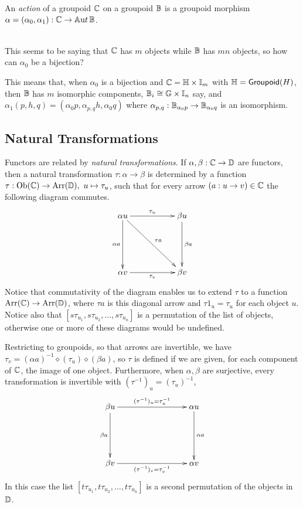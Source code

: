 \begin{defn}
An \emph{action} of a groupoid $\mathbb{C}$ on a groupoid $\mathbb{B}$ 
is a groupoid morphism $\alpha=(\alpha_0,\alpha_1):\mathbb{C}\to\mathbb{A}{\mathrm ut}\,\mathbb{B}$. 
\end{defn}

\\ 
\noindent This seems to be saying that $\mathbb{C}$ has $m$ objects while $\mathbb{B}$ has $mn$ objects, 
so how can $\alpha_0$ be a bijection? 

\medskip
This means that, when $\alpha_0$ is a bijection and 
$\mathbb{C} = \mathbb{H} \times \mathbb{I}_m$ with $\mathbb{H} = {\sf Groupoid}(H)$, 
then $\mathbb{B}$ has $m$ isomorphic components, 
$\mathbb{B}_i \cong \mathbb{G} \times \mathbb{I}_n$ say, 
and $\alpha_1(p,h,q) = (\alpha_0p, \alpha_{p,q}h, \alpha_0q)$ 
where $\alpha_{p,q} : \mathbb{B}_{\alpha_0p} \to \mathbb{B}_{\alpha_0q}$ 
is an isomorphism. 





\newpage
\subsection{Natural Transformations}

Functors are related by \emph{natural transformations}. 
  
If $\alpha,\beta : \mathbb{C} \to \mathbb{D}$ are functors, 
then a natural transformation  $\tau : \alpha \to \beta$ 
is determined by a function 
$\tau : \mathrm{Ob}(\mathbb{C}) \to \mathrm{Arr}(\mathbb{D}),~ u \mapsto \tau_u$, 
such that for every arrow $(a : u \to v) \in \mathbb{C}$ 
the following diagram commutes.
$$
\xymatrix{ 
  \alpha u  \ar[rr]^{\tau_u} \ar[dd]_{\alpha a} \ar[ddrr]^{\tau a}
    &&  \beta u \ar[dd]^{\beta a} \\
    &&  \\
  \alpha v  \ar[rr]_{\tau_v} 
    &&  \beta v  \\
}
$$
Notice that commutativity of the diagram enables us to extend $\tau$ 
to a function $\mathrm{Arr}(\mathbb{C}) \to \mathrm{Arr}(\mathbb{D})$, 
where $\tau a$ is this diagonal arrow and 
$\tau 1_u=\tau_u$ for each object $u$. 
Notice also that $[s\tau_{u_1},s\tau_{u_2},\ldots,s\tau_{u_n}]$ 
is a permutation of the list of objects, 
otherwise one or more of these diagrams would be undefined.

\medskip
Restricting to groupoids, so that arrows are invertible, 
we have $\tau_v = (\alpha a)^{-1}\diamond(\tau_u)\diamond(\beta a)$, 
so $\tau$ is defined if we are given, for each component of $\mathbb{C}$, 
the image of one object. 
Furthermore, when $\alpha,\beta$ are surjective, 
every transformation is invertible with $(\tau^{-1})_u = (\tau_u)^{-1}$,  
$$
\xymatrix{ 
  \beta u  \ar[rrr]^{(\tau^{-1})_u = \tau_u^{-1}} \ar[dd]_{\beta a} 
    &&&  \alpha u \ar[dd]^{\alpha a} \\
    &&&  \\
  \beta v  \ar[rrr]_{(\tau^{-1})_v = \tau_v^{-1}}  
    &&&  \alpha v  \\
}
$$
In this case the list $[t\tau_{u_1},t\tau_{u_2},\ldots,t\tau_{u_n}]$ 
is a second permutation of the objects in $\mathbb{D}$. 

